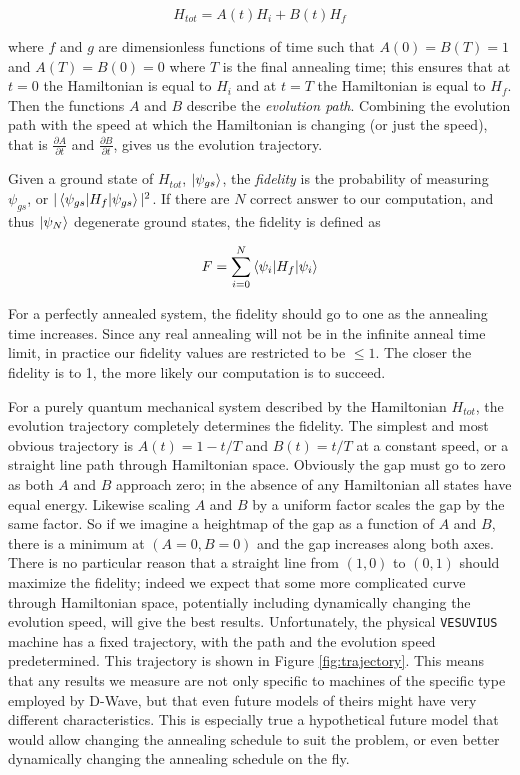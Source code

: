 \begin{equation}
	H_{tot} = A(t)H_i + B(t)H_f
\end{equation}

where $f$ and $g$ are dimensionless functions of time such that $A(0) = B(T) = 1$ and $A(T) = B(0) = 0$ where $T$ is the final annealing time; this ensures that at $t = 0$ the Hamiltonian is equal to $H_i$ and at $t = T$ the Hamiltonian is equal to $H_f$.  Then the functions $A$ and $B$ describe the \emph{evolution path}.  Combining the evolution path with the speed at which the Hamiltonian is changing (or just the speed), that is $\frac{\partial A}{\partial t}$ and $\frac{\partial B}{\partial t}$, gives us the evolution trajectory.  

Given a ground state of $H_{tot}$, $\mathinner{|{\psi_{gs}}\rangle}$, the \emph{fidelity} is the probability of measuring $\psi_{gs}$, or $|\mathinner{\langle{\psi_{gs}|H_f|\psi_{gs}}\rangle}|^2$.  If there are $N$ correct answer to our computation, and thus $\mathinner{|{\psi_N}\rangle}$ degenerate ground states, the fidelity is defined as

\begin{equation}
	F = \sum_{i=0}^N \mathinner{\langle{\psi_i|H_f|\psi_i}\rangle}
\end{equation}

For a perfectly annealed system, the fidelity should go to one as the annealing time increases.  Since any real annealing will not be in the infinite anneal time limit, in practice our fidelity values are restricted to be $\leq 1$.  The closer the fidelity is to 1, the more likely our computation is to succeed.

For a purely quantum mechanical system described by the Hamiltonian $H_{tot}$, the evolution trajectory completely determines the fidelity.
The simplest and most obvious trajectory is $A(t) = 1 - t/T$ and $B(t) = t/T$ at a constant speed, or a straight line path through Hamiltonian space.
Obviously the gap must go to zero as both $A$ and $B$ approach zero; in the absence of any Hamiltonian all states have equal energy.  Likewise scaling $A$ and $B$ by a uniform factor scales the gap by the same factor.  So if we imagine a heightmap of the gap as a function of $A$ and $B$, there is a minimum at $(A=0,B=0)$ and the gap increases along both axes.  
There is no particular reason that a straight line from $(1,0)$ to $(0,1)$ should maximize the fidelity; indeed we expect that some more complicated curve through Hamiltonian space, potentially including dynamically changing the evolution speed, will give the best results.
Unfortunately, the physical \texttt{VESUVIUS} machine has a fixed trajectory, with the path and the evolution speed predetermined.  This trajectory is shown in Figure \ref{fig:trajectory}.
This means that any results we measure are not only specific to machines of the specific type employed by D-Wave, but that even future models of theirs might have very different characteristics.  This is especially true a hypothetical future model that would allow changing the annealing schedule to suit the problem, or even better dynamically changing the annealing schedule on the fly.

